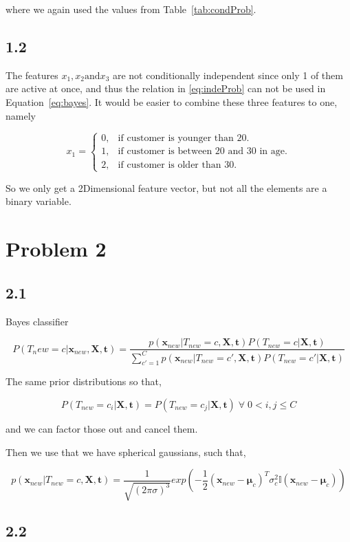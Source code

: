 \documentclass[table,xcdraw]{article}
\begin{document}
where we again used the values from Table~\ref{tab:condProb}.



\subsection*{1.2}

The features $x_1,x_2 \text{and} x_3$ are not conditionally independent since only 1 of them are active at once, and thus the relation in \eqref{eq:indeProb} can not be used in Equation~\eqref{eq:bayes}. It would be easier to combine these three features to one, namely

\[
    x_1= 
\begin{cases}
    0, & \text{if customer is younger than 20.} \\
    1, & \text{if customer is between 20 and 30 in age.}\\
    2, & \text{if customer is older than 30.}
\end{cases}
\]

So we only get a 2Dimensional feature vector, but not all the elements are a binary variable.
 
\newpage 

\section*{Problem 2}
\subsection*{2.1}

Bayes classifier 

\begin{equation}
P(T_new=c|\bm{x}_{new},\bm{X},\bm{t})= \frac{p(\bm{x}_{new}|T_{new}=c,\bm{X},\bm{t})P(T_{new}=c|\bm{X},\bm{t})}{\sum_{c'=1}^{C}p(\bm{x}_{new}|T_{new}=c',\bm{X},\bm{t})P(T_{new}=c'|\bm{X},\bm{t})}
\end{equation}

The same prior distributions so that, 

\begin{equation}
P(T_{new}=c_i|\bm{X},\bm{t}) = P(T_{new}=c_j|\bm{X},\bm{t})\; \forall \; 0 < i,j \leq C
\end{equation}

and we can factor those out and cancel them.

Then we use that we have spherical gaussians, such that,

\begin{equation}
p(\bm{x}_{new}|T_{new}=c,\bm{X},\bm{t}) = \frac{1}{\sqrt{(2\pi\sigma)^3}}exp{\left(-\frac{1}{2}(\bm{x}_{new}-\bm{\mu}_c)^{T}\sigma_c^2 \mathbb{I} (\bm{x}_{new}-\bm{\mu}_c) \right)}
\end{equation}

\subsection*{2.2}
\end{document}
